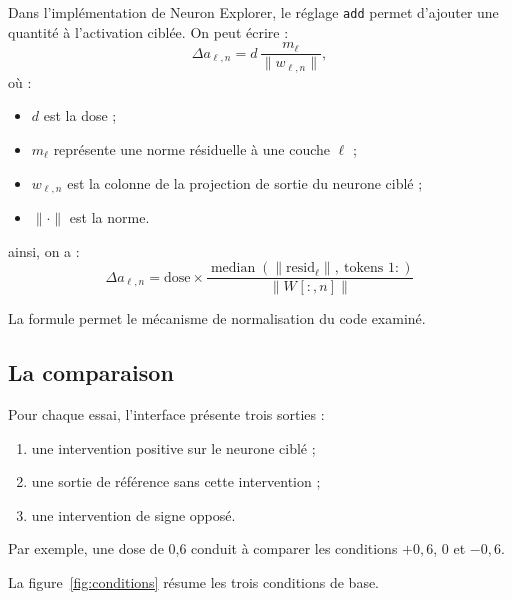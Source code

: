 \documentclass[11pt,a4paper]{article}
\begin{document}
Dans l'implémentation de Neuron Explorer, le réglage \texttt{add} permet d'ajouter une quantité à l'activation ciblée. 
On peut écrire :
\[
    \Delta a_{\ell,n}
    =
    d\,
    \frac{m_{\ell}}{\lVert w_{\ell,n}\rVert},
\]
où :
\begin{itemize}
    \item \(d\) est la dose ;
    \item \(m_{\ell}\) représente une norme résiduelle à une couche \(\ell\) ;
    \item \(w_{\ell,n}\) est la colonne de la projection de sortie du neurone ciblé ;
    \item \(\lVert\cdot\rVert\) est la norme.
\end{itemize}
ainsi, on a : \[
\boxed{
\Delta a_{\ell,n}
=
\text{dose}
\times
\frac{
\operatorname{median}\left(\|\mathrm{resid}_{\ell}\|,\ \text{tokens }1:\right)
}{
\left\|W_{\mathrm{}}[:,n]\right\|
}
}
\]

La formule permet le mécanisme de normalisation du code  examiné.
\subsection{La comparaison}

Pour chaque essai, l'interface présente trois sorties :
\begin{enumerate}
    \item une intervention positive sur le neurone ciblé ;
    \item une sortie de référence sans cette intervention ;
    \item une intervention de signe opposé.
\end{enumerate}

Par exemple, une dose de 0,6 conduit à comparer les conditions \(+0{,}6\), \(0\) et \(-0{,}6\). 

La figure~\ref{fig:conditions} résume les trois conditions de base.
\end{document}
